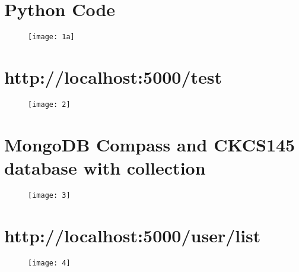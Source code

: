 \documentclass[letterpaper,11pt]{texMemo2} %
\begin{document}
	
	\maketitle %
	
	
	
	
	
	\section{Python Code}
	\begin{figure}[htp]
		\centering 
		
			\texttt{[image: 1a]}%
		
	\end{figure}
		\section{http://localhost:5000/test}
		\begin{figure}[htp]
		\centering 

			\texttt{[image: 2]}%
			
			
		\end{figure}
	\newpage
	\section{MongoDB Compass and CKCS145 database with collection}
	\begin{figure}[htp]
		\centering 
		
			\texttt{[image: 3]}%

	\end{figure}
	
		\section{http://localhost:5000/user/list}
	\begin{figure}[htp]
		\centering 
		
			\texttt{[image: 4]}%
		
		
		
		
	\end{figure}
	\newpage
\end{document}
